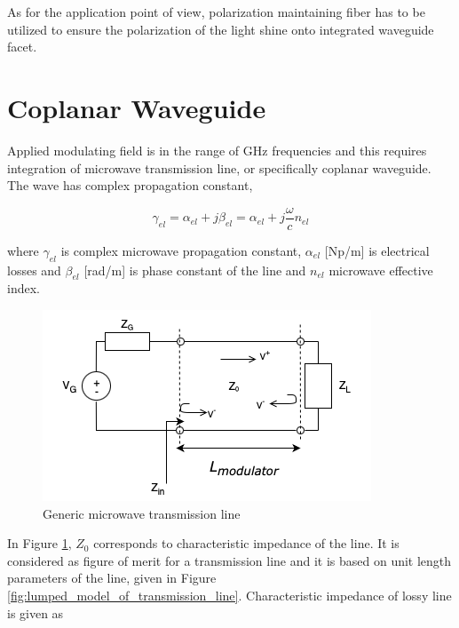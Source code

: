 \documentclass[thesis]{deutez}
\begin{document}
    
    As for the application point of view, polarization maintaining fiber has to be utilized to ensure the polarization of the light shine onto integrated waveguide facet.

    \section{Coplanar Waveguide}
    \label{sec:coplanar_waveguide}

    Applied modulating field is in the range of GHz frequencies and this requires integration of microwave transmission line, or specifically coplanar waveguide. The wave has complex propagation constant,

    \begin{equation}
        \gamma_{el} = \alpha_{el} + j\beta_{el} = \alpha_{el} +j \frac{\omega}{c} n_{el}
        \label{eq:mic-prop-const}
    \end{equation}

    where $\gamma_{el}$ is complex microwave propagation constant, $\alpha_{el}$ [Np/m] is electrical losses and $\beta_{el}$ [rad/m] is phase constant of the line and $n_{el}$ microwave effective index.




    \begin{figure}[h]
        \centering
        \includegraphics[width=0.5\linewidth]{TL_model.png}
        \caption{Generic microwave transmission line}
        \label{fig:transmissionline.png}
    \end{figure}

	In Figure \ref{fig:transmissionline.png}, $Z_0$ corresponds to characteristic impedance of the line. It is considered as figure of merit for a transmission line and it is based on unit length parameters of the line, given in Figure \ref{fig:lumped_model_of_transmission_line}. Characteristic impedance of lossy line is given as 
	
\end{document}
